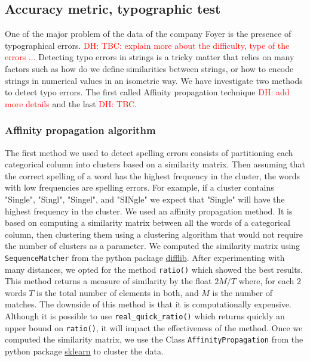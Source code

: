 \documentclass{article}
\newcommand\dhawat[1]{\textcolor{red}{DH: #1}}
\begin{document}


\subsection{Accuracy metric, typographic test} %
\label{sub:Typographic test}
One of the major problem of the data of the company Foyer is the presence of typographical errors.
\dhawat{TBC: explain more about the difficulty, type of the errors ...}
Detecting typo errors in strings is a tricky matter that relies on many factors such as how do we define similarities between strings, or how to encode strings in numerical values in an isometric way.
We have investigate two methods to detect typo errors.
The first called Affinity propagation technique \dhawat{add more details} and the last \dhawat{TBC}.
\subsubsection{Affinity propagation algorithm}
The first method we used to detect spelling errors consists of partitioning each categorical column into clusters based on a similarity matrix.
Then assuming that the correct spelling of a word has the highest frequency in the cluster, the words with low frequencies are spelling errors.
For example, if a cluster contains "Single", "Singl", "Singel", and "SINgle" we expect that "Single" will have the highest frequency in the cluster.
We used an affinity propagation method.
It is based on computing a similarity matrix between all the words of a categorical column, then clustering them using a clustering algorithm that would not require the number of clusters as a parameter.
We computed the similarity matrix using \texttt{SequenceMatcher} from the python package \href{https://docs.python.org/3/library/difflib.html}{difflib}.
After experimenting with many distances, we opted for the method \texttt{ratio()} which showed the best results.
This method returns a measure of similarity by the float $2M /T$ where, for each 2 words $T$ is the total number of elements in both, and $M$ is the number of matches.
The downside of this method is that it is computationally expensive.
Although it is possible to use \texttt{real\_quick\_ratio()} which returns quickly an upper bound on \texttt{ratio()}, it will impact the effectiveness of the method. Once we computed the similarity matrix, we use the Class \texttt{AffinityPropagation} from the python package \href{https://scikit-learn.org/stable/modules/generated/sklearn.cluster.AffinityPropagation.html#sklearn-cluster-affinitypropagation}{sklearn} to cluster the data.
\end{document}
